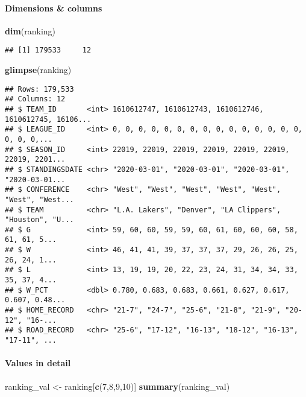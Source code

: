 \documentclass[
]{article}
\newenvironment{Shaded}{\begin{snugshade}}{\end{snugshade}}
\newcommand{\DecValTok}[1]{\textcolor[rgb]{0.00,0.00,0.81}{#1}}
\newcommand{\KeywordTok}[1]{\textcolor[rgb]{0.13,0.29,0.53}{\textbf{#1}}}
\newcommand{\NormalTok}[1]{#1}
\newcommand{\StringTok}[1]{\textcolor[rgb]{0.31,0.60,0.02}{#1}}
\begin{document}
\hypertarget{dimensions-columns}{%
\paragraph{Dimensions \& columns}\label{dimensions-columns}}

\begin{Shaded}
\begin{Highlighting}[]
\KeywordTok{dim}\NormalTok{(ranking)}
\end{Highlighting}
\end{Shaded}

\begin{verbatim}
## [1] 179533     12
\end{verbatim}

\begin{Shaded}
\begin{Highlighting}[]
\KeywordTok{glimpse}\NormalTok{(ranking)}
\end{Highlighting}
\end{Shaded}

\begin{verbatim}
## Rows: 179,533
## Columns: 12
## $ TEAM_ID       <int> 1610612747, 1610612743, 1610612746, 1610612745, 16106...
## $ LEAGUE_ID     <int> 0, 0, 0, 0, 0, 0, 0, 0, 0, 0, 0, 0, 0, 0, 0, 0, 0, 0,...
## $ SEASON_ID     <int> 22019, 22019, 22019, 22019, 22019, 22019, 22019, 2201...
## $ STANDINGSDATE <chr> "2020-03-01", "2020-03-01", "2020-03-01", "2020-03-01...
## $ CONFERENCE    <chr> "West", "West", "West", "West", "West", "West", "West...
## $ TEAM          <chr> "L.A. Lakers", "Denver", "LA Clippers", "Houston", "U...
## $ G             <int> 59, 60, 60, 59, 59, 60, 61, 60, 60, 60, 58, 61, 61, 5...
## $ W             <int> 46, 41, 41, 39, 37, 37, 37, 29, 26, 26, 25, 26, 24, 1...
## $ L             <int> 13, 19, 19, 20, 22, 23, 24, 31, 34, 34, 33, 35, 37, 4...
## $ W_PCT         <dbl> 0.780, 0.683, 0.683, 0.661, 0.627, 0.617, 0.607, 0.48...
## $ HOME_RECORD   <chr> "21-7", "24-7", "25-6", "21-8", "21-9", "20-12", "16-...
## $ ROAD_RECORD   <chr> "25-6", "17-12", "16-13", "18-12", "16-13", "17-11", ...
\end{verbatim}

\hypertarget{values-in-detail-2}{%
\paragraph{Values in detail}\label{values-in-detail-2}}

\begin{Shaded}
\begin{Highlighting}[]
\NormalTok{ranking\_val \textless{}{-}}\StringTok{ }\NormalTok{ranking[}\KeywordTok{c}\NormalTok{(}\DecValTok{7}\NormalTok{,}\DecValTok{8}\NormalTok{,}\DecValTok{9}\NormalTok{,}\DecValTok{10}\NormalTok{)]}
\KeywordTok{summary}\NormalTok{(ranking\_val)}
\end{Highlighting}
\end{Shaded}
\end{document}
